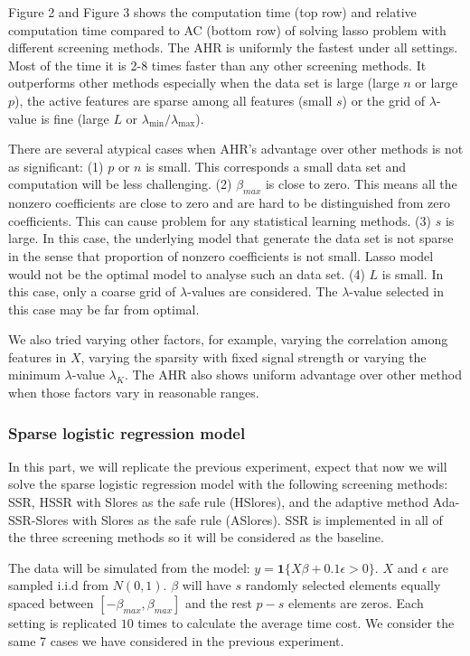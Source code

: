 Figure 2 and Figure 3 shows the computation time (top row) and relative computation time compared to AC (bottom row) of solving lasso problem with different screening methods. The AHR is uniformly the fastest under all settings. Most of the time it is 2-8 times faster than any other screening methods. It outperforms other methods especially when the data set is large (large $n$ or large $p$), the active features are sparse among all features (small $s$) or the grid of $\lambda$-value is fine (large $L$ or $\lambda_{\min}/\lambda_{\max}$). 

There are several atypical cases when AHR's advantage over other methods is not as significant: (1) $p$ or $n$ is small. This corresponds a small data set and computation will be less challenging. (2) $\beta_{max}$ is close to zero. This means all the nonzero coefficients are close to zero and are hard to be distinguished from zero coefficients. This can cause problem for any statistical learning methods. (3) $s$ is large. In this case, the underlying model that generate the data set is not sparse in the sense that proportion of nonzero coefficients is not small. Lasso model would not be the optimal model to analyse such an data set. (4) $L$ is small. In this case, only a coarse grid of $\lambda$-values are considered. The $\lambda$-value selected in this case may be far from optimal.

We also tried varying other factors, for example, varying the correlation among features in $X$, varying the sparsity with fixed signal strength or varying the minimum $\lambda$-value $\lambda_K$. The AHR also shows uniform advantage over other method when those factors vary in reasonable ranges.

\subsubsection{Sparse logistic regression model}

In this part, we will replicate the previous experiment, expect that now we will solve the sparse logistic regression model with the following screening methods: SSR, HSSR with Slores as the safe rule (HSlores), and the adaptive method Ada-SSR-Slores with Slores as the safe rule (ASlores). SSR is implemented in all of the three screening methods so it will be considered as the baseline.

The data will be simulated from the model: $y=\mathbf{1}\{X\beta+0.1\epsilon >0\}$. $X$ and $\epsilon$ are sampled i.i.d from $N(0,1)$. $\beta$ will have $s$ randomly selected elements equally spaced between $[-\beta_{max},\beta_{max}]$ and the rest $p-s$ elements are zeros. Each setting is replicated $10$ times to calculate the average time cost. We consider the same 7 cases we have considered in the previous experiment.

